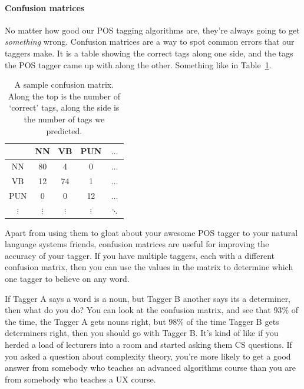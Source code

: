 \paragraph{Confusion matrices}

No matter how good our POS tagging algorithms are, they're always going to get
\textit{something} wrong. Confusion matrices are a way to spot common errors
that our taggers make. It is a table showing the correct tags along one side,
and the tags the POS tagger came up with along the other. Something like in
Table~\ref{table:conf-matrix}.

\begin{table}[h]
  \centering
  \begin{tabular}{|c|c|c|c|c|}
    \hline
        & NN  & VB  & PUN & $\dots$\\ \hline
    NN  & 80  & 4   & 0   & $\dots$\\ \hline
    VB  & 12  & 74  & 1   & $\dots$\\ \hline
    PUN & 0   & 0   & 12  & $\dots$\\ \hline
    $\vdots$ & $\vdots$ & $\vdots$ & $\vdots$ & $\ddots$\\ \hline
  \end{tabular}
  \caption{A sample confusion matrix. Along the top is the number of `correct' 
  tags, along the side is the number of tags we predicted.}
  \label{table:conf-matrix}
\end{table}

Apart from using them to gloat about your awesome POS tagger to your natural
language systems friends, confusion matrices are useful for improving the
accuracy of your tagger. If you have multiple taggers, each with a different
confusion matrix, then you can use the values in the matrix to determine which
one tagger to believe on any word.

If Tagger A says a word is a noun, but Tagger B another says its a determiner,
then what do you do? You can look at the confusion matrix, and see that $93\%$
of the time, the Tagger A gets nouns right, but $98\%$ of the time Tagger B gets
determiners right, then you should go with Tagger B. It's kind of like if you
herded a load of lecturers into a room and started asking them CS questions. If
you asked a question about complexity theory, you're more likely to get a good
answer from somebody who teaches an advanced algorithms course than you are from
somebody who teaches a UX course.


